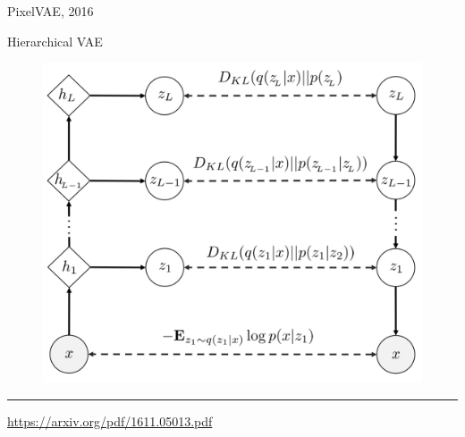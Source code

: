 \documentclass{beamer}
\begin{document}
\begin{frame}{PixelVAE, 2016}
	\begin{block}{Hierarchical VAE}
		\begin{figure}
			\centering
			\includegraphics[width=0.7\linewidth]{figs/PixelVAE_1.png}
		\end{figure}
	\end{block}
	\vfill
	\hrule\medskip
	{\scriptsize \href{https://arxiv.org/pdf/1611.05013.pdf}{https://arxiv.org/pdf/1611.05013.pdf}}
\end{frame}
\end{document}
